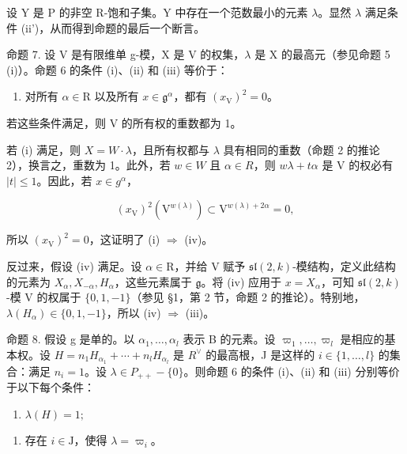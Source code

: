 设 Y 是 P 的非空 R-饱和子集。Y 中存在一个范数最小的元素 \(\lambda\)。显然 \(\lambda\) 满足条件 (ii')，从而得到命题的最后一个断言。

命题 7. 设 V 是有限维单 g-模，X 是 V 的权集，\(\lambda\) 是 X 的最高元（参见命题 5 (i)）。命题 6 的条件 (i)、(ii) 和 (iii) 等价于：

\begin{enumerate}
\def\labelenumi{(\roman{enumi})}
\setcounter{enumi}{3}
\tightlist
\item
  对所有 \(\alpha \in \mathrm{R}\) 以及所有 \(x \in \mathfrak{g}^{\alpha}\)，都有 \((x_{\mathrm{V}})^2 = 0\)。
\end{enumerate}

若这些条件满足，则 V 的所有权的重数都为 1。

若 (i) 满足，则 \(X = W \cdot \lambda\)，且所有权都与 \(\lambda\) 具有相同的重数（命题 2 的推论 2），换言之，重数为 1。此外，若 \(w \in W\) 且 \(\alpha \in R\)，则 \(w\lambda + t\alpha\) 是 V 的权必有 \(|t| \leq 1\)。因此，若 \(x \in g^{\alpha}\)，

\[
(x _ {\mathrm{V}}) ^ {2} (\mathrm{V} ^ {w (\lambda)}) \subset \mathrm{V} ^ {w (\lambda) + 2 \alpha} = 0,
\]

所以 \((x_{\mathrm{V}})^2 = 0\)，这证明了 (i) \(\Longrightarrow\) (iv)。

反过来，假设 (iv) 满足。设 \(\alpha \in \mathrm{R}\)，并给 V 赋予 \(\mathfrak{sl}(2,k)\)-模结构，定义此结构的元素为 \(X_{\alpha}, X_{-\alpha}, H_{\alpha}\)，这些元素属于 \(\mathfrak{g}\)。将 (iv) 应用于 \(x = X_{\alpha}\)，可知 \(\mathfrak{sl}(2,k)\)-模 V 的权属于 \(\{0,1,-1\}\)（参见 §1，第 2 节，命题 2 的推论）。特别地，\(\lambda(H_{\alpha}) \in \{0,1,-1\}\)，所以 (iv) \(\Longrightarrow\) (iii)。

命题 8. 假设 g 是单的。以 \(\alpha_{1},\ldots,\alpha_{l}\) 表示 B 的元素。设 \(\varpi_{1},\ldots,\varpi_{l}\) 是相应的基本权。设 \(H = n_{1}H_{\alpha_{1}} + \cdots + n_{l}H_{\alpha_{l}}\) 是 \(R^{\vee}\) 的最高根，J 是这样的 \(i \in \{1,\ldots,l\}\) 的集合：满足 \(n_{i} = 1\)。设 \(\lambda \in P_{++} - \{0\}\)。则命题 6 的条件 (i)、(ii) 和 (iii) 分别等价于以下每个条件：

\begin{enumerate}
\def\labelenumi{(\alph{enumi})}
\setcounter{enumi}{21}
\tightlist
\item
  \(\lambda(H)=1;\)
\end{enumerate}

\begin{enumerate}
\def\labelenumi{(\roman{enumi})}
\setcounter{enumi}{5}
\tightlist
\item
  存在 \(i \in \mathrm{J}\)，使得 \(\lambda = \varpi_i\)。
\end{enumerate}

